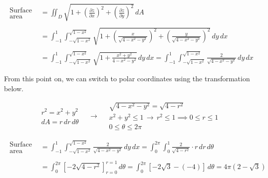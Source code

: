 \documentclass{article}
\begin{document}
\begin{align*}
\begin{array}{c}
\text{Surface}\\\text{area}
\end{array}&=\iint_D\sqrt{1+\left(\frac{\partial z}{\partial x}\right)^2+\left(\frac{\partial z}{\partial y}\right)^2}\,dA\\\\&=\int_{-1}^1\int_{-\sqrt{1-x^2}}^{\sqrt{1-x^2}}\sqrt{1+\left(\frac{x}{\sqrt{4-x^2-y^2}}\right)^2+\left(\frac{y}{\sqrt{4-x^2-y^2}}\right)^2}\,dy\,dx\\\\&=\int_{-1}^1\int_{-\sqrt{1-x^2}}^{\sqrt{1-x^2}}\sqrt{1+\frac{x^2+y^2}{4-x^2-y^2}}\,dy\,dx=\int_{-1}^1\int_{-\sqrt{1-x^2}}^{\sqrt{1-x^2}}\frac2{\sqrt{4-x^2-y^2}}\,dy\,dx\end{align*}

\newpage

From this point on, we can switch to polar coordinates using the transformation below.

\[
\begin{array}{c}
r^2=x^2+y^2\\
dA=r\,dr\,d\theta
\end{array}\quad\rightarrow\quad
\begin{array}{c}
\sqrt{4-x^2-y^2}=\sqrt{4-r^2}\\[0.3cm]
x^2+y^2\leq1\,\rightarrow\,r^2\leq1\implies0\leq r\leq1\\[0.3cm]
0\leq\theta\leq2\pi
\end{array}
\]

\begin{align*}
\begin{array}{c}
\text{Surface}\\\text{area}
\end{array}&=\int_{-1}^1\int_{-\sqrt{1-x^2}}^{\sqrt{1-x^2}}\frac2{\sqrt{4-x^2-y^2}}\,dy\,dx=\int_0^{2\pi}\int_0^1\frac2{\sqrt{4-r^2}}\cdot r\,dr\,d\theta\\\\&=\int_0^{2\pi}\left[-2\sqrt{4-r^2}\right]_{r=0}^{r=1}\,d\theta=\int_0^{2\pi}\left[-2\sqrt3-\left(-4\right)\right]\,d\theta=\boxed{4\pi\left(2-\sqrt3\right)}\end{align*}

\vspace{1em}
\end{document}

